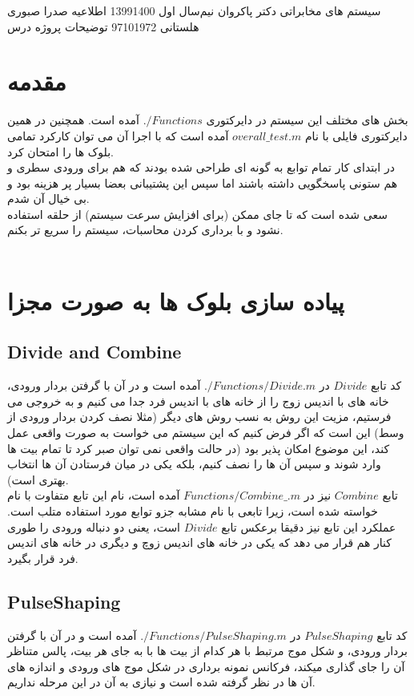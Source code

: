 \documentclass[a4paper,12pt]{article}
\begin{document}
\handout
{سیستم های مخابراتی}
{دکتر پاکروان}
{نیم‌سال اول 1399\lr{-}1400}
{اطلاعیه}
{صدرا صبوری هلستانی}
{97101972}
 {توضیحات پروژه درس}
\section{مقدمه}
بخش های مختلف این سیستم در دایرکتوری $./Functions$ آمده است. همچنین در همین دایرکتوری فایلی با نام $overall\_test.m$ آمده است که با اجرا آن می توان کارکرد تمامی بلوک ها را امتحان کرد.
\\
در ابتدای کار تمام توابع به گونه ای طراحی شده بودند که هم برای ورودی سطری و هم ستونی پاسخگویی داشته باشند اما سپس این پشتیبانی بعضا بسیار پر هزینه بود و بی خیال آن شدم.
\\
سعی شده است که تا جای ممکن (برای افزایش سرعت سیستم) از حلقه استفاده نشود و با برداری کردن محاسبات، سیستم را سریع تر بکنم.
\\
\\
\section{پیاده سازی بلوک ها به صورت مجزا}
\subsection{Divide and Combine}
کد تابع $Divide$ در $./Functions/Divide.m$ آمده است و در آن با گرفتن بردار ورودی، خانه های با اندیس زوج را از خانه های با اندیس فرد جدا می کنیم و به خروجی می فرستیم، مزیت این روش به نسب روش های دیگر (مثلا نصف کردن بردار ورودی از وسط) این است که اگر فرض کنیم که این سیستم می خواست به صورت واقعی عمل کند، این موضوع امکان پذیر بود (در حالت واقعی نمی توان صبر کرد تا تمام بیت ها وارد شوند و سپس آن ها را نصف کنیم، بلکه یکی در میان فرستادن آن ها انتخاب بهتری است).
\\
تابع $Combine$ نیز در $Functions/Combine\_.m$ آمده است، نام این تابع متفاوت با نام خواسته شده است، زیرا تابعی با نام مشابه جزو توابع مورد استفاده متلب است. عملکرد این تابع نیز دقیقا برعکس تابع $Divide$ است، یعنی دو دنباله ورودی را طوری کنار هم قرار می دهد که یکی در خانه های اندیس زوچ و دیگری در خانه های اندیس فرد قرار بگیرد.
\\
\subsection{PulseShaping}
کد تابع $PulseShaping$ در $./Functions/PulseShaping.m$ آمده است و در آن با گرفتن بردار ورودی، و شکل موج مرتبط با هر کدام از بیت ها با به جای هر بیت، پالس متناظر آن را جای گذاری میکند، فرکانس نمونه برداری در شکل موج های ورودی و اندازه های آن ها در نظر گرفته شده است و نیازی به آن در این مرحله نداریم.
\\
\end{document}
